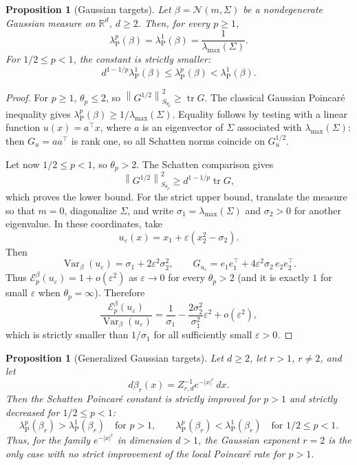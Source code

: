 \documentclass{article}
\newtheorem{proposition}[theorem]{Proposition}
\newcommand{\R}{\mathbb{R}}
\newcommand{\tr}{\operatorname{tr}}
\newcommand{\norm}[1]{\left\lVert #1 \right\rVert}
\begin{document}
\begin{proposition}[Gaussian targets]
\label{prop:gaussian-poincare-schatten}
Let $\beta=\mathcal N(m,\Sigma)$ be a nondegenerate Gaussian measure on
$\R^d$, $d\ge2$.  Then, for every $p\ge1$,
\[
    \lambda_{\mathrm P}^{p}(\beta)
    =
    \lambda_{\mathrm P}^{1}(\beta)
    =
    \frac{1}{\lambda_{\max}(\Sigma)} .
\]
For $1/2\le p<1$, the constant is strictly smaller:
\[
    d^{1-1/p}\lambda_{\mathrm P}^{1}(\beta)
    \le
    \lambda_{\mathrm P}^{p}(\beta)
    <
    \lambda_{\mathrm P}^{1}(\beta).
\]
\end{proposition}

\begin{proof}
For $p\ge1$, $\theta_p\le2$, so
$\norm{G^{1/2}}_{S_{\theta_p}}^2\ge\tr G$.  The classical Gaussian Poincar\'e
inequality gives
$\lambda_{\mathrm P}^{p}(\beta)\ge1/\lambda_{\max}(\Sigma)$.  Equality follows
by testing with a linear function $u(x)=a^\top x$, where $a$ is an eigenvector
of $\Sigma$ associated with $\lambda_{\max}(\Sigma)$: then $G_u=aa^\top$ is
rank one, so all Schatten norms coincide on $G_u^{1/2}$.

Let now $1/2\le p<1$, so $\theta_p>2$.  The Schatten comparison gives
\[
    \norm{G^{1/2}}_{S_{\theta_p}}^2
    \ge
    d^{1-1/p}\tr G,
\]
which proves the lower bound.  For the strict upper bound, translate the
measure so that $m=0$, diagonalize $\Sigma$, and write
$\sigma_1=\lambda_{\max}(\Sigma)$ and $\sigma_2>0$ for another eigenvalue.  In
these coordinates, take
\[
    u_\varepsilon(x)=x_1+\varepsilon(x_2^2-\sigma_2).
\]
Then
\[
    \operatorname{Var}_\beta(u_\varepsilon)
    =
    \sigma_1+2\varepsilon^2\sigma_2^2,
    \qquad
    G_{u_\varepsilon}
    =
    e_1e_1^\top+4\varepsilon^2\sigma_2\,e_2e_2^\top .
\]
Thus $\mathcal E_p^\beta(u_\varepsilon)=1+o(\varepsilon^2)$ as
$\varepsilon\to0$ for every $\theta_p>2$ (and it is exactly $1$ for small
$\varepsilon$ when $\theta_p=\infty$).  Therefore
\[
    \frac{\mathcal E_p^\beta(u_\varepsilon)}
         {\operatorname{Var}_\beta(u_\varepsilon)}
    =
    \frac{1}{\sigma_1}
    -\frac{2\sigma_2^2}{\sigma_1^2}\varepsilon^2
    +o(\varepsilon^2),
\]
which is strictly smaller than $1/\sigma_1$ for all sufficiently small
$\varepsilon>0$.
\end{proof}

\begin{proposition}[Generalized Gaussian targets]
\label{prop:power-poincare-schatten}
Let $d\ge2$, let $r>1$, $r\ne2$, and let
\[
    d\beta_r(x)=Z_{r,d}^{-1}e^{-|x|^r}\,dx .
\]
Then the Schatten Poincar\'e constant is strictly improved for $p>1$ and
strictly decreased for $1/2\le p<1$:
\[
    \lambda_{\mathrm P}^{p}(\beta_r)
    >
    \lambda_{\mathrm P}^{1}(\beta_r)
    \quad\text{for }p>1,
    \qquad
    \lambda_{\mathrm P}^{p}(\beta_r)
    <
    \lambda_{\mathrm P}^{1}(\beta_r)
    \quad\text{for }1/2\le p<1 .
\]
Thus, for the family $e^{-|x|^r}$ in dimension $d>1$, the Gaussian exponent
$r=2$ is the only case with no strict improvement of the local Poincar\'e rate
for $p>1$.
\end{proposition}
\end{document}
